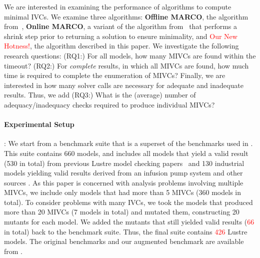 We are interested in examining the performance of algorithms to compute minimal IVCs.  We examine three algorithms: \textbf{Offline MARCO}, the algorithm from~\cite{Ghass17AllIVCs}, \textbf{Online MARCO}, a variant of the algorithm from~\cite{Ghass17AllIVCs} that performs a shrink step prior to returning a solution to ensure minimality, and \textcolor{red}{Our New Hotness!}, the algorithm described in this paper.  We investigate the following research questions: (RQ1:) For all models, how many MIVCs are found within the timeout?  (RQ2:) For {\em complete} results, in which all MIVCs are found, how much time is required to complete the enumeration of MIVCs?  Finally, we are interested in how many solver calls are necessary for adequate and inadequate results.  Thus, we add (RQ3:) What is the (average) number of adequacy/inadequacy checks required to produce individual MIVCs?


\paragraph{Experimental Setup}:  We start from a benchmark suite that is a superset of the benchmarks used in \cite{Ghass17AllIVCs}. This suite contains 660 models, and includes all models that yield a valid result (530 in total) from previous Lustre model checking papers~\cite{Hagen08:FMCAD,piskac2016} and 130 industrial models yielding valid results derived from an infusion pump system \cite{hilt2013} and other sources \cite{piskac2016,NFM2015:backes}.
As this paper is concerned with analysis problems involving multiple MIVCs, we include only models that had more than 5 MIVCs (360 models in total).  To consider problems with many IVCs, we took the models that produced more than 20 MIVCs (7 models in total) and mutated them, constructing 20 mutants for each model.  We added the mutants that still yielded valid results (\textcolor{red}{66} in total) back to the benchmark suite.
Thus, the final suite contains \textcolor{red}{426} Lustre models. The original benchmarks and our augmented benchmark are available from \cite{bench}.

